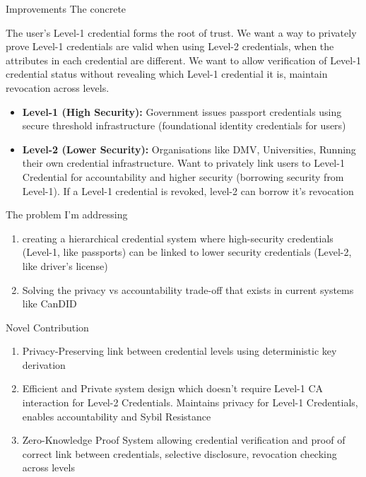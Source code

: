 Improvements
The concrete 













The user's Level-1 credential forms the root of trust.
We want a way to privately prove Level-1 credentials are valid when using Level-2 credentials, when the attributes in each credential are different. We want to allow verification of Level-1 credential status without revealing which Level-1 credential it is, maintain revocation across levels.
\begin{itemize}
    \item \textbf{Level-1 (High Security):} Government issues passport credentials using secure threshold infrastructure (foundational identity credentials for users)
    \item \textbf{Level-2 (Lower Security):} Organisations like DMV, Universities, Running their own credential infrastructure. Want to privately link users to Level-1 Credential for accountability and higher security (borrowing security from Level-1). If a Level-1 credential is revoked, level-2 can borrow it's revocation
\end{itemize}

The problem I'm addressing
\begin{enumerate}
    \item creating a hierarchical credential system where high-security credentials (Level-1, like passports) can be linked to lower security credentials (Level-2, like driver's license)
    \item Solving the privacy vs accountability trade-off that exists in current systems like CanDID
\end{enumerate}

Novel Contribution
\begin{enumerate}
    \item Privacy-Preserving link between credential levels using deterministic key derivation
    \item Efficient and Private system design which doesn't require Level-1 CA interaction for Level-2 Credentials. Maintains privacy for Level-1 Credentials, enables accountability and Sybil Resistance
    \item Zero-Knowledge Proof System allowing credential verification and proof of correct link between credentials, selective disclosure, revocation checking across levels
\end{enumerate}


